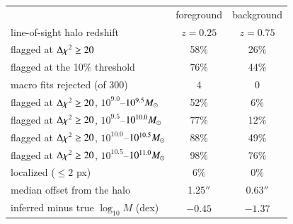 \begin{tabular}{@{}lcc@{}}
\toprule
 & foreground & background \\
line-of-sight halo redshift & $z=0.25$ & $z=0.75$ \\
\midrule
flagged at $\Delta\chi^2\ge20$ & 58\% & 26\% \\
flagged at the 10\% threshold & 76\% & 44\% \\
macro fits rejected (of 300) & 4 & 0 \\
\quad flagged at $\Delta\chi^2\ge20$, $10^{9.0}$--$10^{9.5}M_\odot$ & 52\% & 6\% \\
\quad flagged at $\Delta\chi^2\ge20$, $10^{9.5}$--$10^{10.0}M_\odot$ & 77\% & 12\% \\
\quad flagged at $\Delta\chi^2\ge20$, $10^{10.0}$--$10^{10.5}M_\odot$ & 88\% & 49\% \\
\quad flagged at $\Delta\chi^2\ge20$, $10^{10.5}$--$10^{11.0}M_\odot$ & 98\% & 76\% \\
\addlinespace[2pt]
localized ($\le2$ px) & 6\% & 0\% \\
median offset from the halo & 1.25$''$ & 0.63$''$ \\
inferred minus true $\log_{10}M$ (dex) & $-0.45$ & $-1.37$ \\
\bottomrule
\end{tabular}
